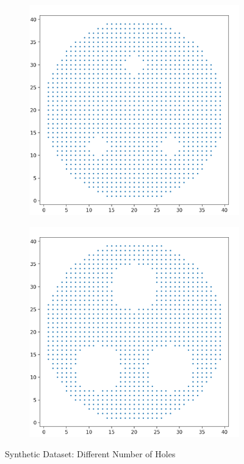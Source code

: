 \documentclass[10pt]{article}
\begin{document}
\begin{figure}[H]
\begin{subfigure}[h]{0.2\textwidth}
    \end{subfigure}%
    \begin{subfigure}[h]{0.2\textwidth}
        \includegraphics[width=\linewidth]{mh_7}
    \end{subfigure}%
    \begin{subfigure}[h]{0.2\textwidth}
        \includegraphics[width=\linewidth]{mh_8}
    \end{subfigure}%
    \caption{Synthetic Dataset: Different Number of Holes}
    \label{fig:multiholes_dataset}
\end{figure}
\end{document}
